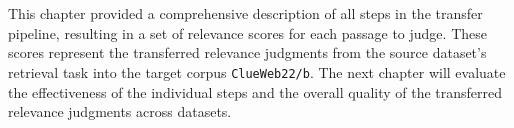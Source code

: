 \\\\
This chapter provided a comprehensive description of all steps in the transfer pipeline, resulting in a set of relevance scores for each passage to judge. These scores represent the transferred relevance judgments from the source dataset's retrieval task into the target corpus \texttt{ClueWeb22/b}. The next chapter will evaluate the effectiveness of the individual steps and the overall quality of the transferred relevance judgments across datasets.